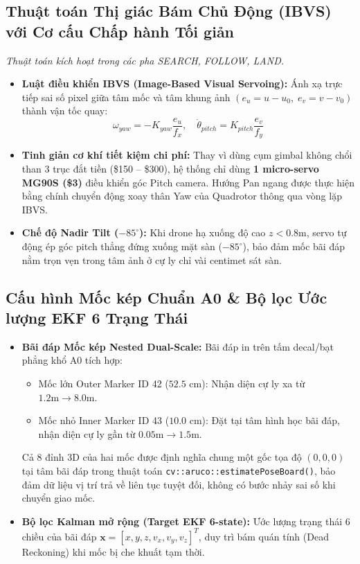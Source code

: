 \documentclass[12pt,a4paper]{article}
\begin{document}
\subsection{Thuật toán Thị giác Bám Chủ Động (IBVS) với Cơ cấu Chấp hành Tối giản}
\textit{Thuật toán kích hoạt trong các pha SEARCH, FOLLOW, LAND.}

\begin{itemize}[noitemsep,topsep=2pt]
    \item \textbf{Luật điều khiển IBVS (Image-Based Visual Servoing):} Ánh xạ trực tiếp sai số pixel giữa tâm mốc và tâm khung ảnh $(e_u = u - u_0, \; e_v = v - v_0)$ thành vận tốc quay:
    \begin{equation}
        \omega_{yaw} = -K_{yaw} \frac{e_u}{f_x}, \quad \dot{\theta}_{pitch} = K_{pitch} \frac{e_v}{f_y}
    \end{equation}
    \item \textbf{Tinh giản cơ khí tiết kiệm chi phí:} Thay vì dùng cụm gimbal không chổi than 3 trục đắt tiền (\$150 -- \$300), hệ thống chỉ dùng \textbf{1 micro-servo MG90S (\$3)} điều khiển góc Pitch camera. Hướng Pan ngang được thực hiện bằng chính chuyển động xoay thân Yaw của Quadrotor thông qua vòng lặp IBVS.
    \item \textbf{Chế độ Nadir Tilt ($-85^\circ$):} Khi drone hạ xuống độ cao $z < 0.8\text{m}$, servo tự động ép góc pitch thẳng đứng xuống mặt sàn ($-85^\circ$), bảo đảm mốc bãi đáp nằm trọn vẹn trong tâm ảnh ở cự ly chỉ vài centimet sát sàn.
\end{itemize}

\subsection{Cấu hình Mốc kép Chuẩn A0 \& Bộ lọc Ước lượng EKF 6 Trạng Thái}
\begin{itemize}[noitemsep,topsep=2pt]
    \item \textbf{Bãi đáp Mốc kép Nested Dual-Scale:} Bãi đáp in trên tấm decal/bạt phẳng khổ A0 tích hợp:
    \begin{itemize}[noitemsep]
        \item Mốc lớn Outer Marker ID 42 ($52.5\text{ cm}$): Nhận diện cự ly xa từ $1.2\text{m} \to 8.0\text{m}$.
        \item Mốc nhỏ Inner Marker ID 43 ($10.0\text{ cm}$): Đặt tại tâm hình học bãi đáp, nhận diện cự ly gần từ $0.05\text{m} \to 1.5\text{m}$.
    \end{itemize}
    Cả 8 đỉnh 3D của hai mốc được định nghĩa chung một gốc tọa độ $(0,0,0)$ tại tâm bãi đáp trong thuật toán \texttt{cv::aruco::estimatePoseBoard()}, bảo đảm dữ liệu vị trí trả về liên tục tuyệt đối, không có bước nhảy sai số khi chuyển giao mốc.
    \item \textbf{Bộ lọc Kalman mở rộng (Target EKF 6-state):} Ước lượng trạng thái 6 chiều của bãi đáp $\mathbf{x} = [x, y, z, v_x, v_y, v_z]^T$, duy trì bám quán tính (Dead Reckoning) khi mốc bị che khuất tạm thời.
\end{itemize}
\end{document}

